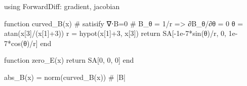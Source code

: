 \documentclass[
  a4paper,
  DIV=11]{scrreprt}
\newenvironment{Shaded}{\begin{snugshade}}{\end{snugshade}}
\newcommand{\BuiltInTok}[1]{\textcolor[rgb]{0.00,0.23,0.31}{#1}}
\newcommand{\CommentTok}[1]{\textcolor[rgb]{0.37,0.37,0.37}{#1}}
\newcommand{\ControlFlowTok}[1]{\textcolor[rgb]{0.00,0.23,0.31}{#1}}
\newcommand{\FloatTok}[1]{\textcolor[rgb]{0.68,0.00,0.00}{#1}}
\newcommand{\FunctionTok}[1]{\textcolor[rgb]{0.28,0.35,0.67}{#1}}
\newcommand{\ImportTok}[1]{\textcolor[rgb]{0.00,0.46,0.62}{#1}}
\newcommand{\KeywordTok}[1]{\textcolor[rgb]{0.00,0.23,0.31}{#1}}
\newcommand{\NormalTok}[1]{\textcolor[rgb]{0.00,0.23,0.31}{#1}}
\newcommand{\OperatorTok}[1]{\textcolor[rgb]{0.37,0.37,0.37}{#1}}
\begin{document}
\begin{Shaded}
\begin{Highlighting}[]
\ImportTok{using} \BuiltInTok{ForwardDiff}\NormalTok{: gradient, jacobian}

\KeywordTok{function} \FunctionTok{curved\_B}\NormalTok{(x)}
    \CommentTok{\# satisify ∇⋅B=0}
    \CommentTok{\# B\_θ = 1/r =\textgreater{} ∂B\_θ/∂θ = 0}
\NormalTok{    θ }\OperatorTok{=} \FunctionTok{atan}\NormalTok{(x[}\FloatTok{3}\NormalTok{]}\OperatorTok{/}\NormalTok{(x[}\FloatTok{1}\NormalTok{]}\OperatorTok{+}\FloatTok{3}\NormalTok{))}
\NormalTok{    r }\OperatorTok{=} \FunctionTok{hypot}\NormalTok{(x[}\FloatTok{1}\NormalTok{]}\OperatorTok{+}\FloatTok{3}\NormalTok{, x[}\FloatTok{3}\NormalTok{])}
    \ControlFlowTok{return}\NormalTok{ SA[}\FunctionTok{{-}1e{-}7*sin}\NormalTok{(θ)}\OperatorTok{/}\NormalTok{r, }\FloatTok{0}\NormalTok{, }\FloatTok{1e{-}7}\FunctionTok{*cos}\NormalTok{(θ)}\OperatorTok{/}\NormalTok{r]}
\KeywordTok{end}

\KeywordTok{function} \FunctionTok{zero\_E}\NormalTok{(x)}
    \ControlFlowTok{return}\NormalTok{ SA[}\FloatTok{0}\NormalTok{, }\FloatTok{0}\NormalTok{, }\FloatTok{0}\NormalTok{]}
\KeywordTok{end}

\FunctionTok{abs\_B}\NormalTok{(x) }\OperatorTok{=} \FunctionTok{norm}\NormalTok{(}\FunctionTok{curved\_B}\NormalTok{(x))  }\CommentTok{\# |B|}


\end{Highlighting}
\end{Shaded}
\end{document}
